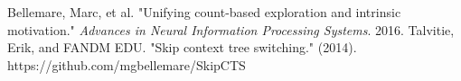 \documentclass{article}
\begin{document}
\begin{thebibliography}{plain}
Bellemare, Marc, et al. "Unifying count-based exploration and intrinsic motivation." \textit{Advances in Neural Information Processing Systems}. 2016.
Talvitie, Erik, and FANDM EDU. "Skip context tree switching." (2014).
https://github.com/mgbellemare/SkipCTS
\end{thebibliography}
\end{document}
